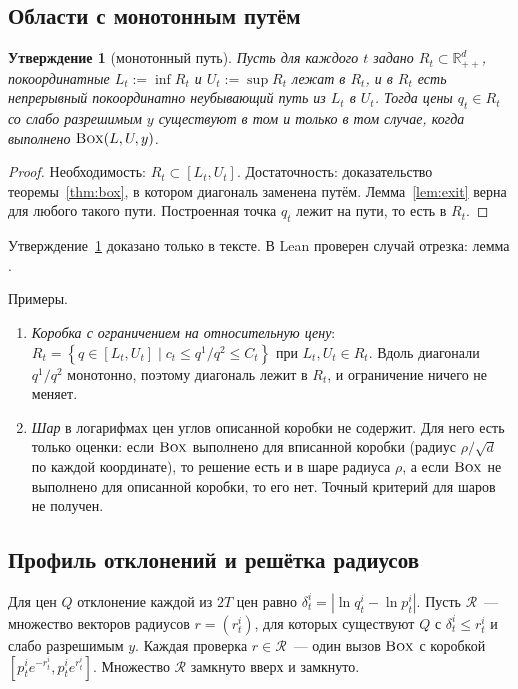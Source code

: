 \documentclass[a4paper,11pt]{article}
\newcommand{\lean}[1]{\mbox{\path{#1}}}
\theoremstyle{plain}
\newtheorem{proposition}[theorem]{Утверждение}
\theoremstyle{definition}
\theoremstyle{remark}
\newcommand{\R}{\mathbb{R}}
\newcommand{\abs}[1]{\left\lvert #1 \right\rvert}
\newcommand{\set}[1]{\left\{ #1 \right\}}
\newcommand{\Rpp}[1][2]{\R^{#1}_{++}}
\newcommand{\BOX}{\textup{\textsc{Box}}}
\begin{document}
\subsection{Области с монотонным путём}

\begin{proposition}[монотонный путь]\label{prop:path}
    Пусть для каждого $t$ задано $R_t\subset\Rpp[d]$, покоординатные $L_t:=\inf R_t$ и $U_t:=\sup R_t$ лежат в $R_t$, и в $R_t$ есть непрерывный покоординатно неубывающий путь из $L_t$ в $U_t$. Тогда цены $q_t\in R_t$ со слабо разрешимым $y$ существуют в том и только в том случае, когда выполнено $\BOX(L,U,y)$.
\end{proposition}

\begin{proof}
    Необходимость: $R_t\subset[L_t,U_t]$. Достаточность: доказательство теоремы~\ref{thm:box}, в котором диагональ заменена путём. Лемма~\ref{lem:exit} верна для любого такого пути. Построенная точка $q_t$ лежит на пути, то есть в $R_t$.
\end{proof}

Утверждение~\ref{prop:path} доказано только в тексте. В Lean проверен случай отрезка: лемма \lean{exists_point_between}.

Примеры.
\begin{enumerate}[label=(\alph*)]
    \item \emph{Коробка с ограничением на относительную цену}: $R_t=\set{q\in[L_t,U_t]\mid c_t\le q^1/q^2\le C_t}$ при $L_t,U_t\in R_t$. Вдоль диагонали $q^1/q^2$ монотонно, поэтому диагональ лежит в $R_t$, и ограничение ничего не меняет.
    \item \emph{Шар} в логарифмах цен углов описанной коробки не содержит. Для него есть только оценки: если $\BOX$ выполнено для вписанной коробки (радиус $\rho/\sqrt d$ по каждой координате), то решение есть и в шаре радиуса $\rho$, а если $\BOX$ не выполнено для описанной коробки, то его нет. Точный критерий для шаров не получен.
\end{enumerate}

\subsection{Профиль отклонений и решётка радиусов}\label{sec:profile}

Для цен $Q$ отклонение каждой из $2T$ цен равно $\delta^i_t=\abs{\ln q^i_t-\ln p^i_t}$. Пусть $\mathcal R$~--- множество векторов радиусов $r=(r^i_t)$, для которых существуют $Q$ с $\delta^i_t\le r^i_t$ и слабо разрешимым $y$. Каждая проверка $r\in\mathcal R$~--- один вызов $\BOX$ с коробкой $[p^i_te^{-r^i_t},p^i_te^{r^i_t}]$. Множество $\mathcal R$ замкнуто вверх и замкнуто.
\end{document}
